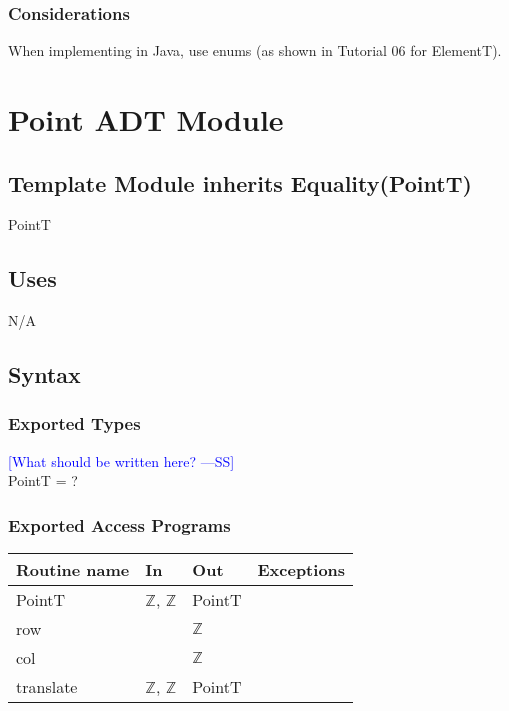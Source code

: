 \documentclass[12pt]{article}
\newcommand{\authornote}[3]{\textcolor{#1}{[#3 ---#2]}}
\newcommand{\authornote}[3]{}
\newcommand{\wss}[1]{\authornote{blue}{SS}{#1}}
\begin{document}
\subsubsection* {Considerations}

When implementing in Java, use enums (as shown in Tutorial 06 for ElementT).

\newpage

\section* {Point ADT Module}

\subsection*{Template Module inherits Equality(PointT)}

PointT

\subsection* {Uses}

N/A

\subsection* {Syntax}

\subsubsection* {Exported Types}

\wss{What should be written here?}\\
PointT = ?

\subsubsection* {Exported Access Programs}

\begin{tabular}{| l | l | l | l |}
\hline
\textbf{Routine name} & \textbf{In} & \textbf{Out} & \textbf{Exceptions}\\
\hline
PointT & $\mathbb{Z}$, $\mathbb{Z}$ & PointT & \\
\hline
row & ~ & $\mathbb{Z}$ & ~\\
\hline
col & ~ & $\mathbb{Z}$ & ~\\
\hline
translate & $\mathbb{Z}$, $\mathbb{Z}$ & PointT & ~\\
\hline
\end{tabular}
\end{document}

